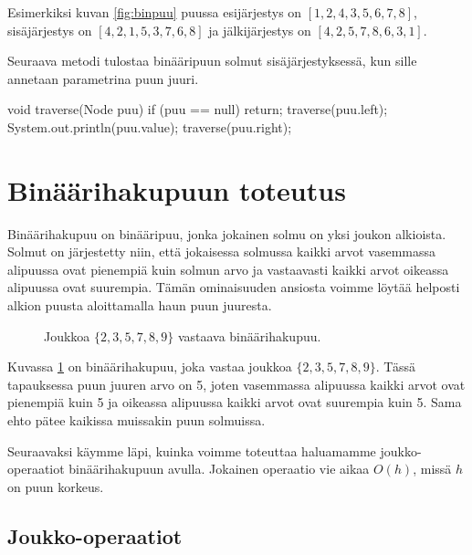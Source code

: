 Esimerkiksi kuvan \ref{fig:binpuu} puussa
esijärjestys on $[1,2,4,3,5,6,7,8]$,
sisäjärjes\-tys on $[4,2,1,5,3,7,6,8]$ ja
jälkijärjestys on $[4,2,5,7,8,6,3,1]$.

Seuraava metodi tulostaa binääripuun solmut
sisäjärjestyksessä, kun sille annetaan parametrina
puun juuri.

\begin{code}
void traverse(Node puu) {
    if (puu == null) return;
    traverse(puu.left);
    System.out.println(puu.value);
    traverse(puu.right);
}
\end{code}

\section{Binäärihakupuun toteutus}

Binäärihakupuu on binääripuu, jonka jokainen solmu
on yksi joukon alkioista.
Solmut on järjestetty niin, että jokaisessa solmussa
kaikki arvot vasemmassa alipuussa ovat pienempiä
kuin solmun arvo ja vastaavasti kaikki arvot 
oikeassa alipuussa ovat suurempia.
Tämän ominaisuuden ansiosta voimme löytää helposti
alkion puusta aloittamalla haun puun juuresta.

\begin{figure}
\center
{}
\caption{Joukkoa $\{2,3,5,7,8,9\}$ vastaava binäärihakupuu.}
\label{fig:bihpuu}
\end{figure}

Kuvassa \ref{fig:bihpuu} on binäärihakupuu,
joka vastaa joukkoa $\{2,3,5,7,8,9\}$.
Tässä tapauksessa puun juuren arvo on 5,
joten vasemmassa alipuussa kaikki arvot
ovat pienempiä kuin 5 ja oikeassa alipuussa
kaikki arvot ovat suurempia kuin 5.
Sama ehto pätee kaikissa muissakin puun solmuissa.

Seuraavaksi käymme läpi, kuinka voimme toteuttaa
haluamamme joukko-operaatiot
binäärihakupuun avulla.
Jokainen operaatio vie aikaa $O(h)$,
missä $h$ on puun korkeus.

\subsection{Joukko-operaatiot}

